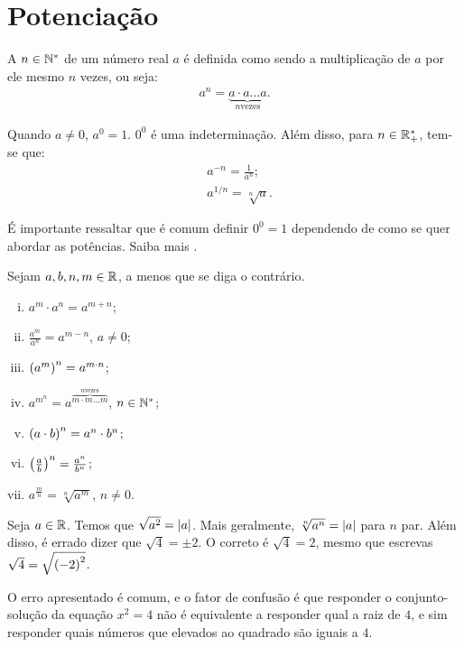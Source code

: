 \section{Potenciação}

\begin{definition}
A  $n \in \mathbb{N}^*$ de um número real $a$ é definida
como sendo a multiplicação de $a$ por ele mesmo $n$ vezes, ou seja:
%
\begin{align*}
a^n = \underbrace{a \cdot a  \dots  a}_{n \text{
vezes}}.
\end{align*}
\end{definition}

\begin{definition}
Quando $a \neq 0$, $a^0 = 1$. $0^0$ é uma indeterminação. Além disso, para $n \in \mathbb{R}^*_+$, tem-se que: 
\begin{align*}
&a^{-n} = \frac{1}{a^n}; \\
&a^{1/n} = \sqrt[n] a.
\end{align*}
\end{definition}

\begin{remark}
É importante ressaltar que é comum definir $0^0 =1$ dependendo de como se quer abordar as potências. Saiba mais .
\end{remark}

\begin{proposition}[Propriedades]
Sejam $a, b, n, m \in \mathbb{R}$, a menos que se diga o contrário.
\begin{enumerate}[i.]
  \item $a^m \cdot a^n = a^{m+n}$;
  \item $\frac {a^m}{a^n} = a^{m-n}$, $a \neq 0$;
  \item $\left(a^m\right)^n = a^{m\cdot n}$;
  \item $a^{m^n} = a^{\overbrace{m \cdot m  \dots  m}^{n \text{
  vezes}}}$, $n \in \mathbb{N}^*$;
  \item $\left(a \cdot b \right)^n= a^n \cdot b^n$;
  \item $\left(\frac a b \right)^n = \frac {a^n} {b^n}$;
  \item $a^{\frac m n} = \sqrt[n]{a^m}$, $n \neq 0$.
\end{enumerate}
\end{proposition}

\begin{remark}
Seja $a \in \mathbb{R}$. Temos que $\sqrt{a^2} = \left|a\right|$. Mais geralmente, $\sqrt[n] {a^n} = \left|a\right|$ para $n$ par. Além disso, é errado dizer que $\sqrt 4 = \pm 2$. O correto é $\sqrt 4 = 2$, mesmo que escrevas $\sqrt 4 = \sqrt{\left(-2\right)^2}$. 

O erro apresentado é comum, e o fator de confusão é que responder o conjunto-solução da equação $x^2=4$ não é equivalente a responder qual a raiz de $4$, e sim responder quais números que elevados ao quadrado são iguais a $4$.
\end{remark}


